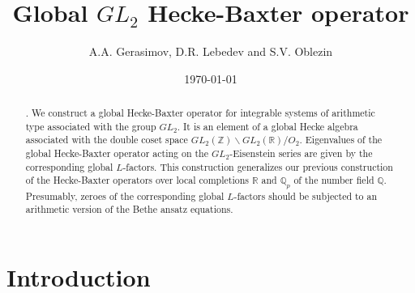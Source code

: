 \documentclass[12pt]{article}
\def\IQ{\mathbb{Q}}
\def\IR{\mathbb{R}}
\def\IZ{\mathbb{Z}}
\newcounter{pac}[section]
\begin{document}
\title{\bf Global $GL_2$ Hecke-Baxter operator}
\author{A.A. Gerasimov, D.R. Lebedev and S.V. Oblezin}
\date{\today}
\maketitle

\renewcommand{\abstractname}{}

\begin{abstract}

  . We construct a global Hecke-Baxter
  operator for integrable systems of arithmetic type associated with
  the group $GL_2$. It is an
  element of a global Hecke algebra associated with the double coset
  space   $GL_2(\IZ)\backslash GL_2(\IR)/O_2$.   Eigenvalues
  of the global Hecke-Baxter
  operator  acting on the $GL_2$-Eisenstein series
  are given by the   corresponding global $L$-factors. This construction generalizes
  our previous construction of the Hecke-Baxter operators  over
  local completions $\IR$ and $\IQ_p$ of the number field $\IQ$.
  Presumably, zeroes of the corresponding global $L$-factors
  should be subjected to an arithmetic version of the Bethe  ansatz
  equations.
\end{abstract}

 \vspace{5mm}


\section{Introduction}
\end{document}

